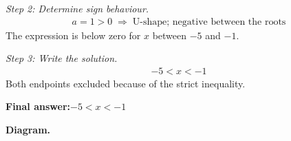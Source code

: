 \documentclass[11pt]{article}
\begin{document}
\textit{Step 2: Determine sign behaviour.}
\[\begin{gathered}
a = 1 > 0 \;\Longrightarrow\; \text{U-shape; negative between the roots}
\end{gathered}\]
The expression is below zero for \( x \) between \( -5 \) and \( -1 \).

\textit{Step 3: Write the solution.}
\[\begin{gathered}
-5 < x < -1
\end{gathered}\]
Both endpoints excluded because of the strict inequality.

\begin{answerbox}
\textbf{Final answer:}\quad \(\displaystyle -5 < x < -1\)
\end{answerbox}
\textbf{Diagram.}

\begin{center}
\end{center}
\end{document}
